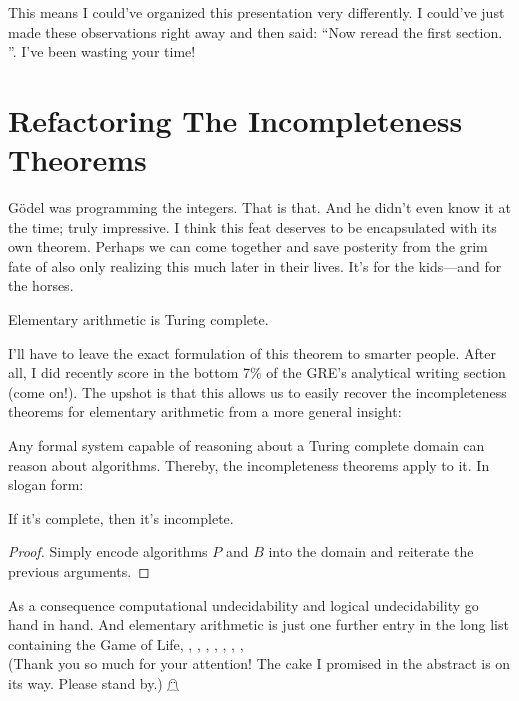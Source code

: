 \documentclass{article}
\theoremstyle{customstyle}
\begin{document}
This means I could've organized this presentation very differently. I could've just made these observations right away and then said: ``Now reread the first section. \scalebox{0.9}{$\square$}''. I've been wasting your time!

\section{Refactoring The Incompleteness Theorems}

Gödel was programming the integers. That is that. And he didn't even know it at the time; truly impressive. I think this feat deserves to be encapsulated with its own theorem. Perhaps we can come together and save posterity from the grim fate of also only realizing this much later in their lives. It's for the kids---and for the horses.

\begin{theorem}
Elementary arithmetic is Turing complete.
\end{theorem}

I'll have to leave the exact formulation of this theorem to smarter people. After all, I did recently score in the bottom 7\% of the GRE's analytical writing section (come on!). The upshot is that this allows us to easily recover the incompleteness theorems for elementary arithmetic from a more general insight:

\begin{theorem}
Any formal system capable of reasoning about a Turing complete domain can reason about algorithms. Thereby, the incompleteness theorems apply to it. In slogan form: 
\begin{center}
If it's complete, then it's incomplete.
\end{center}
\end{theorem}

\begin{proof}
Simply encode algorithms $P$ and $B$ into the domain and reiterate the previous arguments.
\end{proof}

As a consequence computational undecidability and logical undecidability go hand in hand. And elementary arithmetic is just one further entry in the long list containing the Game of Life, \scalebox{0.95}{Fractran}, \scalebox{0.9}{Post Tag Systems}, \scalebox{0.85}{Magic the Gathering}, \scalebox{0.8}{the human brain}, \scalebox{0.75}{Rule 110}, \scalebox{0.7}{the Lambda Calculus}, \scalebox{0.65}{musical notation}, \scalebox{0.6}{\dots}\\[2em]
\footnotesize{(Thank you so much for your attention! The cake I promised in the abstract is on its way. Please stand by.) $\mathghost$}
\end{document}
